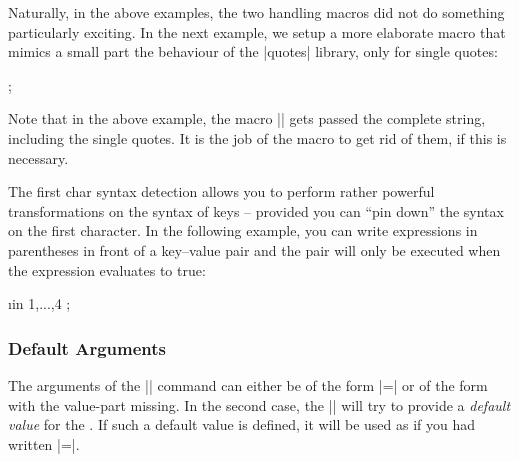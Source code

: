 Naturally, in the above examples, the two handling macros did not do
something particularly exciting. In the next example, we setup a more
elaborate macro that mimics a small part the behaviour of the |quotes|
library, only for single quotes:

\begin{codeexample}[]

\def\mysinglequotemacro#1{\pgfkeysalso{label={#1}}}

\tikz {};
\end{codeexample}

Note that in the above example, the macro |\mysinglequotemacro| gets
passed the complete string, including the single quotes. It is the job
of the macro to get rid of them, if this is necessary.

The first char syntax detection allows you to perform rather powerful
transformations on the syntax of keys -- provided you can ``pin down''
the syntax on the first character. In the following example, you can
write expressions in parentheses in front of a key--value pair and the
pair will only be executed when the expression evaluates to true:

\begin{codeexample}[]

\def\myparamacro#1{\myparaparser#1\someendtext}
\def\myparaparser(#1)#2\someendtext{
  \ifx\pgfmathresult\onetext
  \fi
}
\def\onetext{1}

\foreach \i in {1,...,4}
  \tikz {};
\end{codeexample}


\subsubsection{Default Arguments}

The arguments of the |\pgfkeys| command can either be of the form
|=| or of the form  with the
value-part missing. In the second case, the |\pgfkeys| will try to
provide a \emph{default value} for the . If such a default
value is defined, it will be used as if you had written
|=|.

